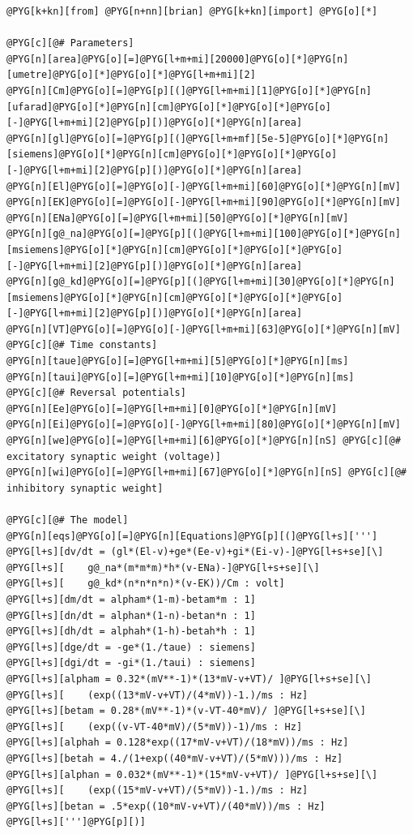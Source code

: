 \documentclass[letterpaper,10pt,english]{manual}
\begin{document}
\begin{Verbatim}[commandchars=@\[\]]
@PYG[k+kn][from] @PYG[n+nn][brian] @PYG[k+kn][import] @PYG[o][*]

@PYG[c][@# Parameters]
@PYG[n][area]@PYG[o][=]@PYG[l+m+mi][20000]@PYG[o][*]@PYG[n][umetre]@PYG[o][*]@PYG[o][*]@PYG[l+m+mi][2]
@PYG[n][Cm]@PYG[o][=]@PYG[p][(]@PYG[l+m+mi][1]@PYG[o][*]@PYG[n][ufarad]@PYG[o][*]@PYG[n][cm]@PYG[o][*]@PYG[o][*]@PYG[o][-]@PYG[l+m+mi][2]@PYG[p][)]@PYG[o][*]@PYG[n][area]
@PYG[n][gl]@PYG[o][=]@PYG[p][(]@PYG[l+m+mf][5e-5]@PYG[o][*]@PYG[n][siemens]@PYG[o][*]@PYG[n][cm]@PYG[o][*]@PYG[o][*]@PYG[o][-]@PYG[l+m+mi][2]@PYG[p][)]@PYG[o][*]@PYG[n][area]
@PYG[n][El]@PYG[o][=]@PYG[o][-]@PYG[l+m+mi][60]@PYG[o][*]@PYG[n][mV]
@PYG[n][EK]@PYG[o][=]@PYG[o][-]@PYG[l+m+mi][90]@PYG[o][*]@PYG[n][mV]
@PYG[n][ENa]@PYG[o][=]@PYG[l+m+mi][50]@PYG[o][*]@PYG[n][mV]
@PYG[n][g@_na]@PYG[o][=]@PYG[p][(]@PYG[l+m+mi][100]@PYG[o][*]@PYG[n][msiemens]@PYG[o][*]@PYG[n][cm]@PYG[o][*]@PYG[o][*]@PYG[o][-]@PYG[l+m+mi][2]@PYG[p][)]@PYG[o][*]@PYG[n][area]
@PYG[n][g@_kd]@PYG[o][=]@PYG[p][(]@PYG[l+m+mi][30]@PYG[o][*]@PYG[n][msiemens]@PYG[o][*]@PYG[n][cm]@PYG[o][*]@PYG[o][*]@PYG[o][-]@PYG[l+m+mi][2]@PYG[p][)]@PYG[o][*]@PYG[n][area]
@PYG[n][VT]@PYG[o][=]@PYG[o][-]@PYG[l+m+mi][63]@PYG[o][*]@PYG[n][mV]
@PYG[c][@# Time constants]
@PYG[n][taue]@PYG[o][=]@PYG[l+m+mi][5]@PYG[o][*]@PYG[n][ms]
@PYG[n][taui]@PYG[o][=]@PYG[l+m+mi][10]@PYG[o][*]@PYG[n][ms]
@PYG[c][@# Reversal potentials]
@PYG[n][Ee]@PYG[o][=]@PYG[l+m+mi][0]@PYG[o][*]@PYG[n][mV]
@PYG[n][Ei]@PYG[o][=]@PYG[o][-]@PYG[l+m+mi][80]@PYG[o][*]@PYG[n][mV]
@PYG[n][we]@PYG[o][=]@PYG[l+m+mi][6]@PYG[o][*]@PYG[n][nS] @PYG[c][@# excitatory synaptic weight (voltage)]
@PYG[n][wi]@PYG[o][=]@PYG[l+m+mi][67]@PYG[o][*]@PYG[n][nS] @PYG[c][@# inhibitory synaptic weight]

@PYG[c][@# The model]
@PYG[n][eqs]@PYG[o][=]@PYG[n][Equations]@PYG[p][(]@PYG[l+s][''']
@PYG[l+s][dv/dt = (gl*(El-v)+ge*(Ee-v)+gi*(Ei-v)-]@PYG[l+s+se][\]
@PYG[l+s][    g@_na*(m*m*m)*h*(v-ENa)-]@PYG[l+s+se][\]
@PYG[l+s][    g@_kd*(n*n*n*n)*(v-EK))/Cm : volt]
@PYG[l+s][dm/dt = alpham*(1-m)-betam*m : 1]
@PYG[l+s][dn/dt = alphan*(1-n)-betan*n : 1]
@PYG[l+s][dh/dt = alphah*(1-h)-betah*h : 1]
@PYG[l+s][dge/dt = -ge*(1./taue) : siemens]
@PYG[l+s][dgi/dt = -gi*(1./taui) : siemens]
@PYG[l+s][alpham = 0.32*(mV**-1)*(13*mV-v+VT)/ ]@PYG[l+s+se][\]
@PYG[l+s][    (exp((13*mV-v+VT)/(4*mV))-1.)/ms : Hz]
@PYG[l+s][betam = 0.28*(mV**-1)*(v-VT-40*mV)/ ]@PYG[l+s+se][\]
@PYG[l+s][    (exp((v-VT-40*mV)/(5*mV))-1)/ms : Hz]
@PYG[l+s][alphah = 0.128*exp((17*mV-v+VT)/(18*mV))/ms : Hz]
@PYG[l+s][betah = 4./(1+exp((40*mV-v+VT)/(5*mV)))/ms : Hz]
@PYG[l+s][alphan = 0.032*(mV**-1)*(15*mV-v+VT)/ ]@PYG[l+s+se][\]
@PYG[l+s][    (exp((15*mV-v+VT)/(5*mV))-1.)/ms : Hz]
@PYG[l+s][betan = .5*exp((10*mV-v+VT)/(40*mV))/ms : Hz]
@PYG[l+s][''']@PYG[p][)]


\end{Verbatim}
\end{document}

